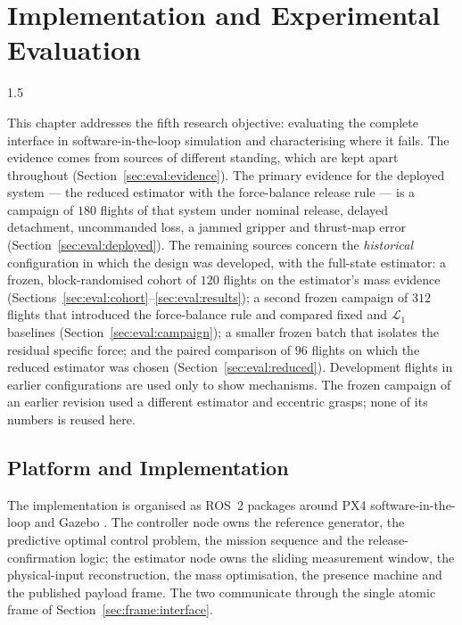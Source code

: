 \chapter{Implementation and Experimental Evaluation}
\label{ch:evaluation}
\begin{spacing}{1.5}
\setlength{\parskip}{0.22in}

This chapter addresses the fifth research objective: evaluating the complete
interface in software-in-the-loop simulation and characterising where it fails.
The evidence comes from sources of different standing, which are kept apart
throughout (Section~\ref{sec:eval:evidence}). The primary evidence for the
deployed system --- the reduced estimator with the force-balance release rule
--- is a campaign of $180$ flights of that system under nominal release,
delayed detachment, uncommanded loss, a jammed gripper and thrust-map error
(Section~\ref{sec:eval:deployed}). The remaining sources concern the
\emph{historical} configuration in which the design was developed, with the
full-state estimator: a frozen, block-randomised cohort of $120$ flights on the
estimator's mass evidence (Sections~\ref{sec:eval:cohort}--\ref{sec:eval:results});
a second frozen campaign of $312$ flights that introduced the force-balance rule
and compared fixed and $\mathcal{L}_1$ baselines
(Section~\ref{sec:eval:campaign}); a smaller frozen batch that isolates the
residual specific force; and the paired comparison of $96$ flights on which the
reduced estimator was chosen (Section~\ref{sec:eval:reduced}). Development
flights in earlier configurations are used only to show mechanisms. The frozen
campaign of an earlier revision used a different estimator and eccentric grasps;
none of its numbers is reused here.

\section{Platform and Implementation}\label{sec:eval:platform}

The implementation is organised as ROS~2 packages around PX4
software-in-the-loop \cite{px4} and Gazebo \cite{gazebo}. The controller node
owns the reference generator, the predictive optimal control problem, the mission
sequence and the release-confirmation logic; the estimator node owns the sliding
measurement window, the physical-input reconstruction, the mass optimisation, the
presence machine and the published payload frame. The two communicate through the
single atomic frame of Section~\ref{sec:frame:interface}.


\end{spacing}
